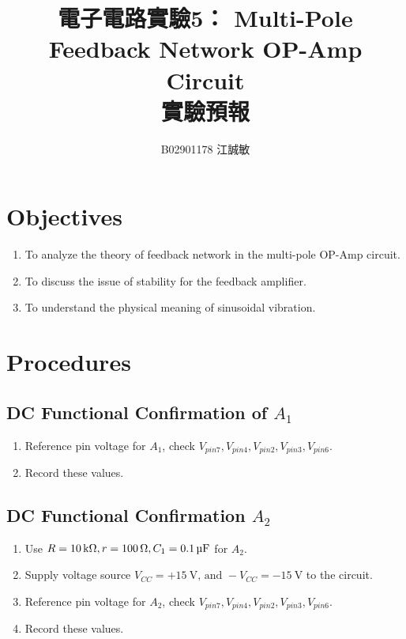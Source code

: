 \documentclass[12pt, a4paper]{article}
\title{ \bf {\huge 電子電路實驗5： Multi-Pole Feedback Network OP-Amp Circuit}\\ 實驗預報}
\author{B02901178 江誠敏}
\begin{document}
\maketitle

\section{Objectives}
\begin{enumerate}
  \item To analyze the theory of feedback network in the multi-pole OP-Amp circuit.
  \item To discuss the issue of stability for the feedback amplifier.
  \item To understand the physical meaning of sinusoidal vibration.
\end{enumerate}


\section{Procedures}
\subsection{DC Functional Confirmation of $A_1$}
\begin{enumerate}[itemsep=0pt]
  \item Reference pin voltage for $A_1$, check $V_{pin7}, V_{pin4}, V_{pin2}, V_{pin3}, V_{pin6}$.
  \item Record these values.
\end{enumerate}

\subsection{DC Functional Confirmation $A_2$}
\begin{enumerate}[itemsep=0pt]
  \item Use $R = \SI{10}\kohm, r = \SI{100}\ohm, C_1 = \SI{0.1}\uF$ for $A_2$.
  \item Supply voltage source $V_{CC} = +\SI{15}\V \text{, and } -V_{CC} = \SI{-15}\V$ to the
    circuit.
  \item Reference pin voltage for $A_2$, check $V_{pin7}, V_{pin4}, V_{pin2}, V_{pin3}, V_{pin6}$.
  \item Record these values.
\end{enumerate}
\end{document}
